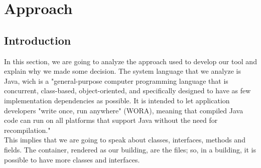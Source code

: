\documentclass[]{usiinfbachelorproject}
\begin{document}
 




\newpage
\section{Approach} \label{approach}

\subsection{Introduction}
In this section, we are going to analyze the approach used to develop our tool and explain why we made some decision. The system language that we analyze is Java, wich is a "general-purpose computer programming language that is concurrent, class-based, object-oriented, and specifically designed to have as few implementation dependencies as possible. It is intended to let application developers "write once, run anywhere" (WORA), meaning that compiled Java code can run on all platforms that support Java without the need for recompilation." \\
This implies that we are going to speak about classes, interfaces, methods and fields. The container, rendered as our building, are the files; so, in a building, it is possible to have more classes and interfaces.
\end{document}
